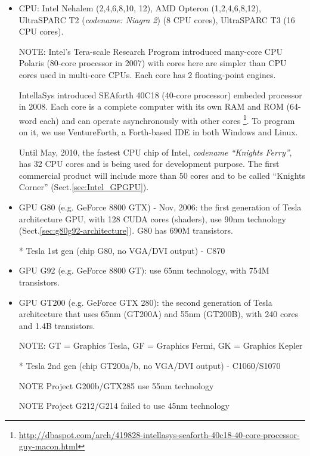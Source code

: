   \begin{itemize}
  \item CPU: Intel Nehalem (2,4,6,8,10, 12), AMD Opteron
    (1,2,4,6,8,12), UltraSPARC T2 ({\it codename: Niagra 2}) (8 CPU cores),
    UltraSPARC T3 (16 CPU cores).
    
    NOTE: Intel's Tera-scale Research Program introduced many-core CPU Polaris
    (80-core processor in 2007) with cores here are simpler than CPU cores used
    in multi-core CPUs. Each core has 2 floating-point engines.
    
    IntellaSys introduced SEAforth 40C18 (40-core processor) embeded processor
    in 2008. Each core is a complete computer with
    its own RAM and ROM (64-word each) and can operate asynchronously with other
    cores
    \footnote{\url{http://dbaspot.com/arch/419828-intellasys-seaforth-40c18-40-core-processor-guy-macon.html}}.
    To program on it, we use  VentureForth, a Forth-based IDE in both Windows and Linux.
    
\begin{framed}
  Until May, 2010, the fastest CPU chip of Intel,
  {\it codename ``Knights Ferry''}, has 32 CPU cores and is being used
  for development purpose. The first commercial product will
  include more than 50 cores and to be called ``Knights Corner''
  (Sect.\ref{sec:Intel_GPGPU}).
\end{framed}
    
  \item GPU G80 (e.g. GeForce 8800 GTX) - Nov, 2006: the first generation of
  Tesla architecture GPU, with 128 CUDA cores (shaders), use 90nm technology
  (Sect.\ref{sec:g80g92-architecture}). G80 has 690M transistors.
  
   
  \item[*] Tesla 1st gen (chip G80, no VGA/DVI output) - C870
  
  \item GPU G92 (e.g. GeForce 8800 GT): use 65nm technology, with 754M
  transistors.
  
  \item GPU GT200 (e.g. GeForce GTX 280): the second generation of Tesla
  architecture that uses 65nm (GT200A) and 55nm (GT200B), with 240 cores and
  1.4B transistors.
  
  NOTE: GT = Graphics Tesla, GF = Graphics Fermi, GK =  Graphics Kepler
  
  \item [*]Tesla 2nd gen (chip GT200a/b, no VGA/DVI output) -
    C1060/S1070
    \item [NOTE] Project G200b/GTX285 use 55nm technology
    \item [NOTE] Project G212/G214 failed to use 45nm technology
    

\end{itemize}
